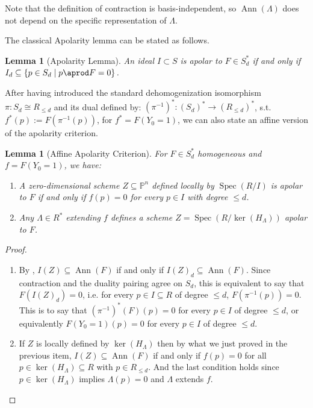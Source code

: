 \documentclass[a4paper,11p]{amsart}
\newtheorem{lemma0}[defn0]{Lemma}
\newenvironment{lemma}{\bigskip \begin{lemma0}}{\end{lemma0}}
\begin{document}
Note that the definition of contraction is basis-independent, so $\operatorname{Ann}(\Lambda)$ does not depend on the specific representation of $\Lambda$.

The classical Apolarity lemma can be stated as follows.
\begin{lemma}[Apolarity Lemma]\label{apolarity:lemma}%
  An ideal $I\subset S$ is apolar to   $F\in S_d^*$ if and only if
%    
    $I_d\subseteq \{p\in S_d\; | \; p\aprod F =0\}$.
\end{lemma}
After having introduced the standard dehomogenization isomorphism $\pi: S_d\cong R_{\leq d}$ and its dual defined by: $(\pi^{-1})^*:(S_d)^*\to (R_{\leq d})^*$, s.t.  $  f^*(p):=F(\pi^{-1}(p))$,  for $f^*=F(Y_0=1)$,
we can also state
an affine version of the apolarity criterion. %

\begin{lemma}[Affine Apolarity Criterion]\label{affine:apolarity:criterion}
For $F\in S_d^*$ homogeneous and $f=F(Y_0=1)$, we have:
\begin{enumerate}[label=\roman*),leftmargin=*]
\item   A zero-dimensional scheme $Z\subseteq \mathbb{P}^n$ defined locally by $\operatorname{Spec}(R/I)$ is apolar to $F$ if and only if $f(p)=0$ for every $p\in I$ with degree $\leq d$.
\item Any $\Lambda\in R^*$ extending $f$ defines a scheme $Z=\operatorname{Spec}(R/\ker(H_\Lambda))$ apolar to $F$.
\end{enumerate}
\end{lemma}

\begin{proof}
\begin{enumerate}[label=\roman*),leftmargin=*]
    \item\label{rmk: affineApolarity} \leavevmode
  By , $I(Z)\subseteq \operatorname{Ann}(F)$ if and only if $I(Z)_d\subseteq \operatorname{Ann}(F)$. Since contraction and the duality pairing agree on $S_d$, this is equivalent to say that $F(I(Z)_d)=0$, i.e. for every $p\in I\subseteq R$ of degree $\leq d$, $F(\pi^{-1}(p))=0$. This is to say that $(\pi^{-1})^*(F)(p)=0$ for every $p\in I$ of degree $\leq d$, or equivalently $F(Y_0=1)(p)=0$ for every $p\in I$ of degree $\leq d$.
\item\label{remark:extensionsAreApolar} If $Z$ is locally defined by $\ker(H_\Lambda)$ then by what we just proved in the previous item, $I(Z)\subseteq \operatorname{Ann}(F)$ if and only if $f(p)=0$ for all $p\in \ker(H_\Lambda)\subseteq R$ with $p\in R_{\leq d}$. And the last condition holds since $p\in \ker(H_\Lambda)$ implies $\Lambda(p)=0$ and $\Lambda$ extends $f$.
\end{enumerate}
\end{proof}
\end{document}
